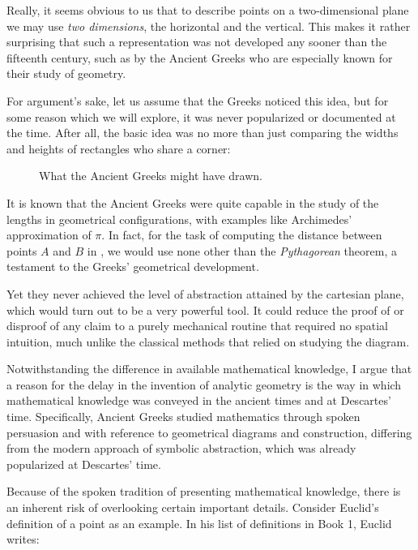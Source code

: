 \documentclass[a4paper, 12pt]{article}
\begin{document}
Really, it seems obvious to us that to describe points
on a two-dimensional plane we may use \textit{two dimensions},
the horizontal and the vertical. This makes it rather surprising
that such a representation was not developed any sooner
than the fifteenth century, such as by the Ancient Greeks who
are especially known for their study of geometry.

For argument's sake, let us assume that the Greeks noticed
this idea, but for some reason which we will explore,
it was never popularized or documented at the time.
After all, the basic idea was no more than just
comparing the widths and heights of rectangles who share
a corner:

\begin{figure}[H]
  \begin{center}
    
  \end{center}
  \caption{What the Ancient Greeks might have drawn.}
  \label{fig:1}
\end{figure}

It is known that the Ancient Greeks were quite capable
in the study of the lengths in geometrical configurations,
with examples like Archimedes' approximation of $\pi$.
In fact, for the task of computing the distance between
points $A$ and $B$ in , we would use none
other than the \textit{Pythagorean} theorem, a testament
to the Greeks' geometrical development.

Yet they never achieved the level of abstraction attained
by the cartesian plane, which would turn out to be a very
powerful tool. It could reduce the proof of or disproof of any
claim to a purely mechanical routine that required no
spatial intuition, much unlike the classical methods that
relied on studying the diagram.

Notwithstanding the difference in available mathematical knowledge,
I argue that a reason for the delay in the invention of analytic
geometry is the way in which mathematical knowledge was conveyed
in the ancient times and at Descartes' time.
Specifically, Ancient Greeks studied mathematics through spoken
persuasion and with reference to geometrical diagrams and construction,
differing from the modern approach of symbolic abstraction, which was
already popularized at Descartes' time.

Because of the spoken tradition of presenting mathematical knowledge,
there is an inherent risk of overlooking certain important details.
Consider Euclid's definition of a point as an example.
In his list of definitions in Book 1, Euclid writes:
\end{document}
